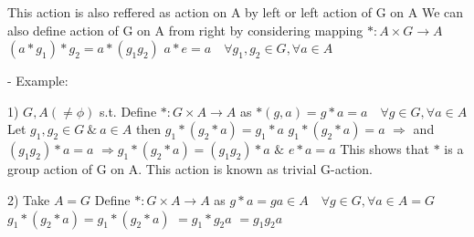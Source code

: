 This action is also reffered as action on A by
left or left action of G on A
We can also define action of G on A from
right by considering mapping
$*: A \times G \longrightarrow A$
$(a * g_1) * g_2 = a * (g_1 g_2)$
$a * e = a \quad \forall g_1, g_2 \in G, \forall a \in A$

- Example:

1) $G, A(\neq \phi)$ s.t.
Define $*: G \times A \longrightarrow A$ as
$*(g, a) = g * a = a \quad \forall g \in G, \forall a \in A$
Let $g_1, g_2 \in G \ \& \ a \in A$
then $g_1 * (g_2 * a) = g_1 * a$
$g_1 * (g_2 * a) = a$
$\Rightarrow$ and $(g_1 g_2) * a = a$
$\Rightarrow g_1 * (g_2 * a) = (g_1 g_2) * a$
$\&$ $e * a = a$
This shows that $*$ is a group action of G on A.
This action is known as trivial G-action.

2) Take $A = G$
Define $*: G \times A \longrightarrow A$ as
$g * a = ga \in A \quad \forall g \in G, \forall a \in A = G$
$g_1 * (g_2 * a) = g_1 * (g_2 * a)$
$= g_1 * g_2 a$
$= g_1 g_2 a$
